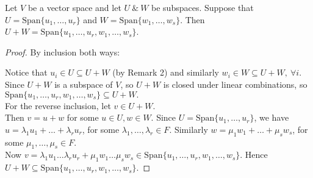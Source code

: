 \begin{proposition}Let 
 $V$ be a vector space and let $U ~\&~ W$ be subspaces. Suppose that $U = \text{Span}\{u_1,\dots,u_r\}$ and $W = \text{Span}\{w_1,\dots,w_s\}$. Then $U + W = \text{Span}\{u_1,\dots,u_r,w_1,\dots,w_s\}$. 
\end{proposition}
\begin{proof}
By inclusion both ways:

Notice that $u_i \in U \subseteq U + W$ (by Remark 2) and similarly $w_i \in W \subseteq U + W, ~\forall i$. Since $U + W$ is a subspace of $V$, so $U + W$ is closed under linear combinations, so $\text{Span}\{u_1,\dots,u_r,w_1,\dots,w_s\} \subseteq U + W.$\\

For the reverse inclusion, let $v \in U + W$.\\ Then $v = u + w$ for some $u \in U, w \in W$. Since $U = \text{Span}\{u_1,\dots,u_r\}$, we have $u = \lambda_1u_1 + \dots + \lambda_ru_r$, for some $\lambda_1,\dots,\lambda_r \in F$. Similarly $w = \mu_1w_1 + \dots + \mu_sw_s$, for some $\mu_1,\dots,\mu_s \in F$.\\

Now $v = \lambda_1u_1 \dots \lambda_ru_r + \mu_1w_1 \dots \mu_sw_s \in \text{Span}\{u_1,\dots,u_r,w_1,\dots,w_s\}$. Hence $U + W \subseteq \text{Span}\{u_1,\dots,u_r,w_1,\dots,w_s\}$.

\end{proof}

